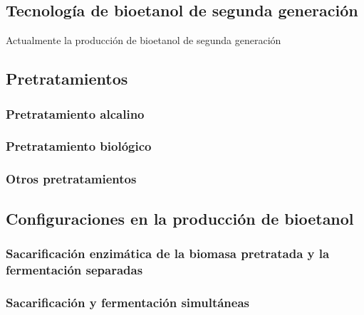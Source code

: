 \documentclass[12pt]{article}
\begin{document}
\subsection{Tecnología de bioetanol de segunda generación}
Actualmente la producción de bioetanol de segunda generación
\subsection{Pretratamientos }

\subsubsection{Pretratamiento alcalino }
\subsubsection{Pretratamiento biológico }
\subsubsection{Otros pretratamientos }


\subsection{Configuraciones en la producción de bioetanol}

\subsubsection{Sacarificación enzimática de la biomasa pretratada y la fermentación separadas }
\subsubsection{Sacarificación y fermentación simultáneas }
\newpage
		
		
	
	
	
	
	
	
	
	
\end{document}
